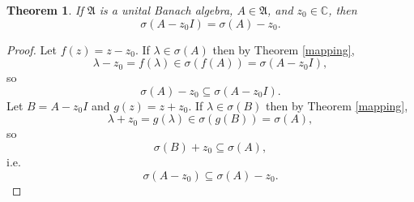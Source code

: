 \documentclass{article}
\newtheorem{theorem}{Theorem}
\theoremstyle{definition}
\begin{document}
\begin{theorem}
 If $\mathfrak{A}$ is a unital Banach algebra, $A \in \mathfrak{A}$, and $z_0 \in \mathbb{C}$, then
 \[
 \sigma(A-z_0I) = \sigma(A)-z_0.
 \]
 \label{translation}
 \end{theorem}
 \begin{proof}
Let $f(z)=z-z_0$. If $\lambda \in \sigma(A)$ then by Theorem \ref{mapping},
\[
\lambda - z_0=f(\lambda) \in \sigma(f(A))= \sigma(A-z_0 I),
\]
so
\[
\sigma(A)-z_0 \subseteq \sigma(A-z_0 I).
\]
Let $B=A-z_0 I$ and $g(z)=z+z_0$.
If $\lambda \in \sigma(B)$ then by Theorem \ref{mapping},
\[
\lambda + z_0=g(\lambda) \in \sigma(g(B)) = \sigma(A),
\]
so
\[
\sigma(B)+z_0 \subseteq \sigma(A),
\]
i.e.
\[
\sigma(A-z_0) \subseteq \sigma(A)-z_0.
\]
 \end{proof} 
\end{document}
